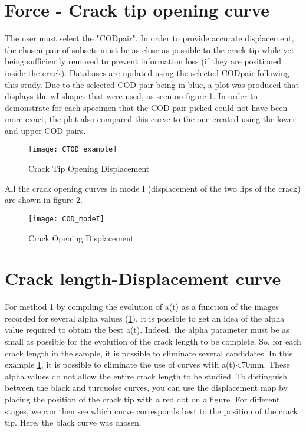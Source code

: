 \section{Force - Crack tip opening curve}

The user must select the "CODpair". In order to provide accurate displacement, the chosen pair of subsets must be as close as possible to the crack tip while yet being sufficiently removed to prevent information loss (if they are positioned inside the crack). Databases are updated using the selected CODpair following this study. Due to the selected COD pair being in blue, a plot was produced that displays the wI shapes that were used, as seen on figure \ref{fig:CTOD_example}. In order to demonstrate for each specimen that the COD pair picked could not have been more exact, the plot also compared this curve to the one created using the lower and upper COD pairs.

\begin{figure}[htp]
	\centering
	\texttt{[image: CTOD\_example]}
	\caption{Crack Tip Opening Displacement}
	\label{fig:CTOD_example}
\end{figure}

All the crack opening curves in mode I (displacement of the two lips of the crack) are shown in figure \ref{fig:COD_modeI}. 

\begin{figure}[htp]
	\centering
	\texttt{[image: COD\_modeI]}
	\caption{Crack Opening Displacement}
	\label{fig:COD_modeI}
\end{figure}

\section{Crack length-Displacement curve}

For method 1 by compiling the evolution of a(t) as a function of the images recorded for several alpha values (\ref{fig:CTOD_example}), it is possible to get an idea of the alpha value required to obtain the best a(t). Indeed, the alpha parameter must be as small as possible for the evolution of the crack length to be complete. So, for each crack length in the sample, it is possible to eliminate several candidates. In this example \ref{fig:CTOD_example}, it is possible to eliminate the use of curves with a(t)<70mm. These alpha values do not allow the entire crack length to be studied. To distinguish between the black and turquoise curves, you can use the displacement map by placing the position of the crack tip with a red dot on a figure. For different stages, we can then see which curve corresponds best to the position of the crack tip. Here, the black curve was chosen.

